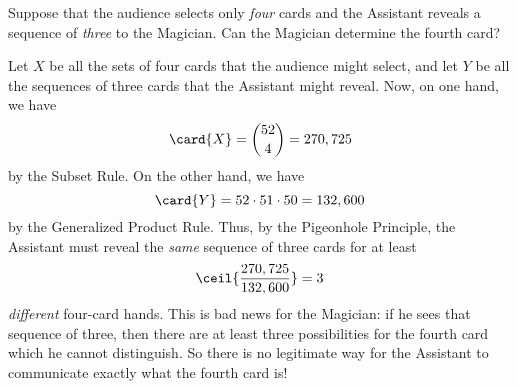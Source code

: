 Suppose that the audience selects only \emph{four} cards and the
Assistant reveals a sequence of \emph{three} to the Magician.  Can the
Magician determine the fourth card?

Let $X$ be all the sets of four cards that the audience might select,
and let $Y$ be all the sequences of three cards that the Assistant
might reveal.  Now, on one hand, we have
\[
\card{X} = \binom{52}{4} = 270,725
\]
by the Subset Rule.  On the other hand, we have
\[
\card{Y} = 52 \cdot 51 \cdot 50 = 132,600
\]
by the Generalized Product Rule.  Thus, by the Pigeonhole Principle, the
Assistant must reveal the \emph{same} sequence of three cards for at
least
\[
\ceil{\frac{270,725}{132,600}} = 3
\]
\emph{different} four-card hands.  This is bad news for the Magician:
if he sees that sequence of three, then there are at least three
possibilities for the fourth card which he cannot distinguish.  So there
is no legitimate way for the Assistant to communicate exactly what the
fourth card is!

